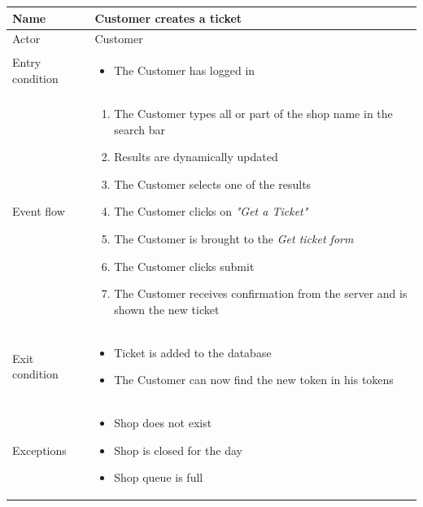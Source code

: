 \begin{table}[H]
    \begin{tabu} to \textwidth {|X|X[4]|}
        \hline
        Name            & Customer creates a ticket  \\ \hline
        Actor           & Customer                   \\ \hline
        Entry condition & \begin{itemize}
            \item The Customer has logged in
        \end{itemize} \\ \hline
        Event flow      & \begin{enumerate}
            \item The Customer types all or part of the shop name in the search bar
            \item Results are dynamically updated
            \item The Customer selects one of the results
            \item The Customer clicks on \emph{"Get a Ticket"}
            \item The Customer is brought to the \emph{Get ticket form}
            \item The Customer clicks submit
            \item The Customer receives confirmation from the server and is shown the new ticket
        \end{enumerate} \\ \hline
        Exit condition  & \begin{itemize}
            \item Ticket is added to the database
            \item The Customer can now find the new token in his tokens
        \end{itemize} \\ \hline
        Exceptions      & \begin{itemize}
            \item Shop does not exist
            \item Shop is closed for the day
            \item Shop queue is full
        \end{itemize} \\ \hline
    \end{tabu}
\end{table}

